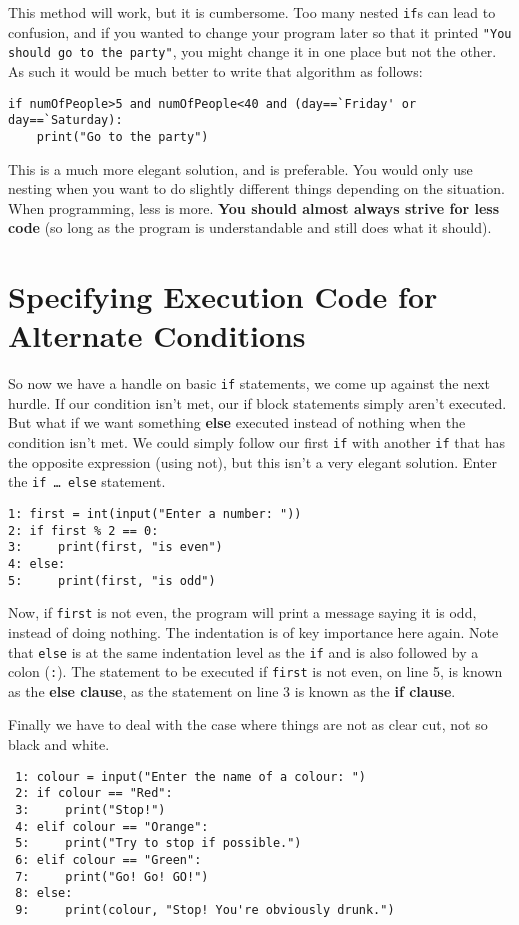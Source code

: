  This method will work, but it is cumbersome. Too many nested \texttt{if}s can lead to confusion, and if you wanted to change your program later so that it printed \texttt{"You should go to the party"}, you might change it in one place but not the other. As such it would be much better to write that algorithm as follows:
\begin{lstlisting}
if numOfPeople>5 and numOfPeople<40 and (day==`Friday' or day==`Saturday):
	print("Go to the party")
\end{lstlisting}

 This is a much more elegant solution, and is preferable. You would only use nesting when you want to do slightly different things depending on the situation. When programming, less is more. \textbf{You should almost always strive for less code} (so long as the program is understandable and still does what it should).



\section{Specifying Execution Code for Alternate Conditions}

So now we have a handle on basic \texttt{if} statements, we come up against   the next hurdle. If our condition isn't met, our if block statements   simply aren't executed. But what if we want something   \textbf{else} executed instead of nothing when the condition   isn't met. We could simply follow our first \texttt{if} with another \texttt{if} that has the opposite expression (using not), but this isn't a very elegant solution. Enter the \texttt{if \ldots\ else} statement.
\begin{lstlisting}
1: first = int(input("Enter a number: "))
2: if first % 2 == 0:
3:     print(first, "is even")
4: else:
5:     print(first, "is odd")
\end{lstlisting}

Now, if \texttt{first} is not even, the program will print a message saying   it is odd, instead of doing nothing. The indentation is of key   importance here again. Note that \texttt{else} is at the same indentation   level as the \texttt{if} and is also followed by a colon (\texttt{:}). The statement   to be executed if \texttt{first} is not even, on line 5, is known as the   \textbf{else clause}, as the statement on line 3 is known as   the \textbf{if clause}.

Finally we have to deal with the case where things are not as clear   cut, not so black and white.
\begin{lstlisting}
 1: colour = input("Enter the name of a colour: ")
 2: if colour == "Red":
 3:     print("Stop!")
 4: elif colour == "Orange":
 5:     print("Try to stop if possible.")
 6: elif colour == "Green":
 7:     print("Go! Go! GO!")
 8: else:
 9:     print(colour, "Stop! You're obviously drunk.")
\end{lstlisting}

